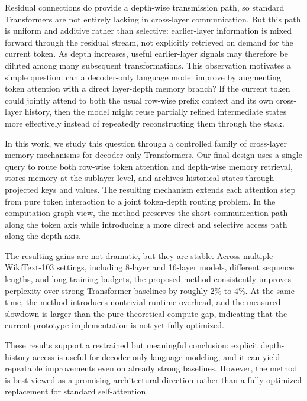 \documentclass[11pt]{article}
\begin{document}
Residual connections do provide a depth-wise transmission path, so standard Transformers are not entirely lacking in cross-layer communication. But this path is uniform and additive rather than selective: earlier-layer information is mixed forward through the residual stream, not explicitly retrieved on demand for the current token. As depth increases, useful earlier-layer signals may therefore be diluted among many subsequent transformations. This observation motivates a simple question: can a decoder-only language model improve by augmenting token attention with a direct layer-depth memory branch? If the current token could jointly attend to both the usual row-wise prefix context and its own cross-layer history, then the model might reuse partially refined intermediate states more effectively instead of repeatedly reconstructing them through the stack.

In this work, we study this question through a controlled family of cross-layer memory mechanisms for decoder-only Transformers. Our final design uses a single query to route both row-wise token attention and depth-wise memory retrieval, stores memory at the sublayer level, and archives historical states through projected keys and values. The resulting mechanism extends each attention step from pure token interaction to a joint token-depth routing problem. In the computation-graph view, the method preserves the short communication path along the token axis while introducing a more direct and selective access path along the depth axis.

The resulting gains are not dramatic, but they are stable. Across multiple WikiText-103 settings, including 8-layer and 16-layer models, different sequence lengths, and long training budgets, the proposed method consistently improves perplexity over strong Transformer baselines by roughly 2\% to 4\%. At the same time, the method introduces nontrivial runtime overhead, and the measured slowdown is larger than the pure theoretical compute gap, indicating that the current prototype implementation is not yet fully optimized.

These results support a restrained but meaningful conclusion: explicit depth-history access is useful for decoder-only language modeling, and it can yield repeatable improvements even on already strong baselines. However, the method is best viewed as a promising architectural direction rather than a fully optimized replacement for standard self-attention.
\end{document}
